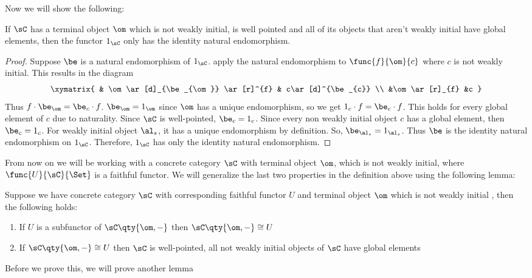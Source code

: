 \documentclass[../../main]{subfiles}
\begin{document}
Now we will show the following:

\begin{lemma}
	If $\sC$ has a terminal object $\om$ which is not weakly initial, is well
	pointed and all of its  objects that aren't weakly initial have global
	elements, then the functor $1_{\sC}$ only has the identity natural
	endomorphism.
\end{lemma}

\begin{proof}
	Suppose $\be$ is a natural endomorphism of $1_{\sC}$. apply the natural
	endomorphism to $\func{f}{\om}{c}$ where $c$ is  not weakly initial. This
	results in the diagram $$\xymatrix{ & \om \ar[d]_{\be_{\om}} \ar[r]^{f} &
	c\ar[d]^{\be_{c}}  \\   &\om \ar[r]_{f} &c  } $$ Thus $f \cdot \be_{\om} =
	\be_{c} \cdot f$. $\be_{\om} = 1_{\om}$ since $\om$ has a unique
	endomorphism, so we get $1_{c} \cdot f  = \be_{c} \cdot f$. This holds for
	every global element of $c$ due to naturality. Since $\sC$ is well-pointed,
	$\be_{c} = 1_{c}$. Since every non weakly initial object $c$ has a global
	element, then $\be_{c} = 1_{c}$. For weakly initial object $\al_{s}$, it has
	a unique endomorphism by definition. So, $\be_{\al_{s}} = 1_{\al_{s}}$. Thus
	$\be$ is the identity natural endomorphism on $1_{\sC}$. Therefore,
	$1_{\sC}$ has only the identity natural endomorphism.
\end{proof}

From now on we will be working with a concrete category $\sC$ with terminal
object $\om$, which is not weakly initial, where $\func{U}{\sC}{\Set}$ is a
faithful functor. We will generalize the last two properties in the definition
above using the following lemma:

\begin{lemma}
	Suppose we have concrete category $\sC$ with corresponding faithful functor
	$U$ and terminal object $\om$ which is not weakly initial , then the
	following holds:
	\begin{enumerate}
		\item If $U$ is a subfunctor of $\sC\qty{\om,-}$ then $\sC\qty{\om,-} \cong U$
		\item If $\sC\qty{\om,-} \cong U$ then $\sC$ is well-pointed, all not
			weakly initial objects of $\sC$ have global elements
	\end{enumerate}
\end{lemma}

Before we prove this, we will prove another lemma
\end{document}
